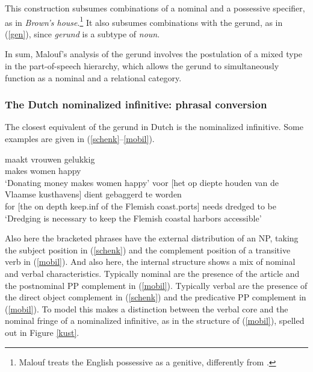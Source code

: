 \documentclass[output=paper]{langsci/langscibook}
\begin{document}
\noindent
This construction subsumes combinations of a nominal and a 
possessive specifier, as in {\it Brown's house}.\footnote{Malouf treats 
the English possessive as a genitive, differently from \citet{SagWasow03}.}   
It also subsumes combinations with the gerund, as in (\ref{gen}), since 
{\it gerund\/} is a subtype of {\it noun}.  

In sum, Malouf's analysis of the gerund involves the postulation of a
mixed type in the part-of-speech hierarchy, which allows the gerund to simultaneously
function as a nominal and a relational category. 


\subsubsection{The Dutch nominalized infinitive: phrasal conversion } 


The closest equivalent of the gerund in Dutch is the nominalized infinitive. 
Some examples are given in (\ref{schenk}--\ref{mobil}). 

\begin{exe} 
\ex\label{schenk} 
 maakt vrouwen gelukkig  \\
       [money donate.{\sc inf}] makes women happy \\
\trans `Donating money makes women happy' 
\ex\label{mobil}   
\gll   voor [het op diepte houden van de Vlaamse kusthavens] dient gebaggerd te worden  \\  
       for [the on depth keep.{\sc inf} of the Flemish coast.ports] needs dredged to be \\
\trans `Dredging is necessary to keep the Flemish coastal harbors accessible'  
\end{exe} 

\noindent
Also here the bracketed phrases have the external distribution of an NP, 
taking the subject position in (\ref{schenk}) and 
the complement position of a transitive verb in (\ref{mobil}). 
And also here, the internal structure shows a mix of nominal and verbal
characteristics. 
Typically nominal are the presence of the article and the postnominal PP
complement in (\ref{mobil}). 
Typically verbal are the presence of the direct object complement in (\ref{schenk})
and the predicative PP complement in (\ref{mobil}). 
To model this \citet{VanEynde19} makes a distinction between the verbal core 
and the nominal fringe of a nominalized infinitive, as in the structure of 
(\ref{mobil}), spelled out in Figure \ref{kust}.  
\end{document}
